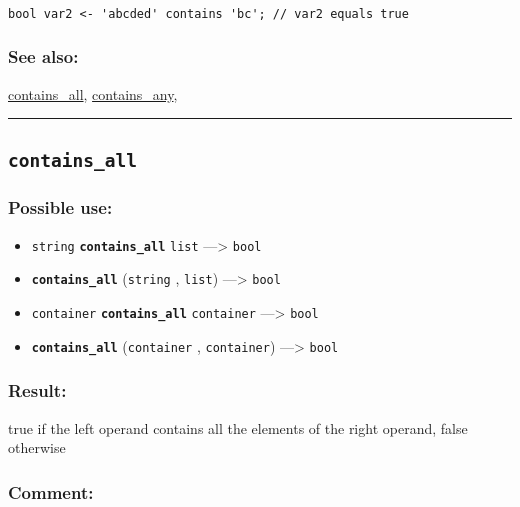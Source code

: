 \documentclass[]{book}
\providecommand{\tightlist}{%
  \setlength{\itemsep}{0pt}\setlength{\parskip}{0pt}}
\theoremstyle{definition}
\theoremstyle{definition}
\theoremstyle{definition}
\theoremstyle{remark}
\begin{document}
\begin{verbatim}
 
bool var2 <- 'abcded' contains 'bc'; // var2 equals true
\end{verbatim}

\subsubsection{See also:}\label{see-also-62}

\href{operators-b-to-c.html\#contains_all}{contains\_all},
\href{operators-b-to-c.html\#contains_any}{contains\_any},

\begin{center}\rule{0.5\linewidth}{\linethickness}\end{center}

\subsection{\texorpdfstring{\texttt{contains\_all}}{contains\_all}}\label{contains_all}

\subsubsection{Possible use:}\label{possible-use-100}

\begin{itemize}
\tightlist
\item
  \texttt{string} \textbf{\texttt{contains\_all}} \texttt{list}
  ---\textgreater{} \texttt{bool}
\item
  \textbf{\texttt{contains\_all}} (\texttt{string} , \texttt{list})
  ---\textgreater{} \texttt{bool}
\item
  \texttt{container} \textbf{\texttt{contains\_all}} \texttt{container}
  ---\textgreater{} \texttt{bool}
\item
  \textbf{\texttt{contains\_all}} (\texttt{container} ,
  \texttt{container}) ---\textgreater{} \texttt{bool}
\end{itemize}

\subsubsection{Result:}\label{result-98}

true if the left operand contains all the elements of the right operand,
false otherwise

\subsubsection{Comment:}\label{comment-25}
\end{document}

